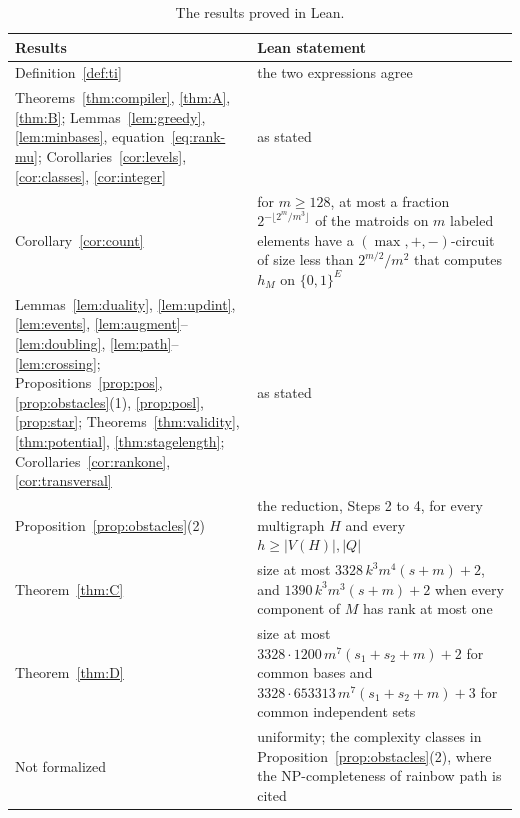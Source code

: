 \begin{table}[ht]
\caption{The results proved in Lean.}
\label{tab:lean}
\centering
\renewcommand{\arraystretch}{1.25}
\begin{tabular}{@{}>{\raggedright\arraybackslash}p{}
                >{\raggedright\arraybackslash}p{}@{}}
\toprule
Results & Lean statement\\
\midrule
Definition~\ref{def:ti} & the two expressions agree\\
Theorems~\ref{thm:compiler}, \ref{thm:A}, \ref{thm:B}; Lemmas~\ref{lem:greedy},
\ref{lem:minbases}, equation~\eqref{eq:rank-mu}; Corollaries~\ref{cor:levels},
\ref{cor:classes}, \ref{cor:integer} & as stated\\
Corollary~\ref{cor:count} & for $m\ge128$, at most a fraction
$2^{-\lfloor2^{m}/m^{3}\rfloor}$ of the matroids on $m$ labeled elements have a
$(\max,+,-)$-circuit of size less than $2^{m/2}/m^{2}$ that computes $h_M$ on
$\{0,1\}^{E}$\\
Lemmas~\ref{lem:duality}, \ref{lem:updint}, \ref{lem:events},
\ref{lem:augment}--\ref{lem:doubling}, \ref{lem:path}--\ref{lem:crossing};
Propositions~\ref{prop:pos}, \ref{prop:obstacles}(1), \ref{prop:posl},
\ref{prop:star}; Theorems~\ref{thm:validity}, \ref{thm:potential},
\ref{thm:stagelength}; Corollaries~\ref{cor:rankone}, \ref{cor:transversal} & as
stated\\
Proposition~\ref{prop:obstacles}(2) & the reduction, Steps 2 to 4, for every
multigraph $H$ and every $h\ge|V(H)|,|Q|$\\
Theorem~\ref{thm:C} & size at most $3328\,k^{3}m^{4}(s+m)+2$, and
$1390\,k^{3}m^{3}(s+m)+2$ when every component of $M$ has rank at most one\\
Theorem~\ref{thm:D} & size at most $3328\cdot1200\,m^{7}(s_1+s_2+m)+2$ for common
bases and $3328\cdot653313\,m^{7}(s_1+s_2+m)+3$ for common independent sets\\
\midrule
Not formalized & uniformity; the complexity classes in
Proposition~\ref{prop:obstacles}(2), where the NP-completeness of rainbow path is
cited\\
\bottomrule
\end{tabular}
\end{table}
